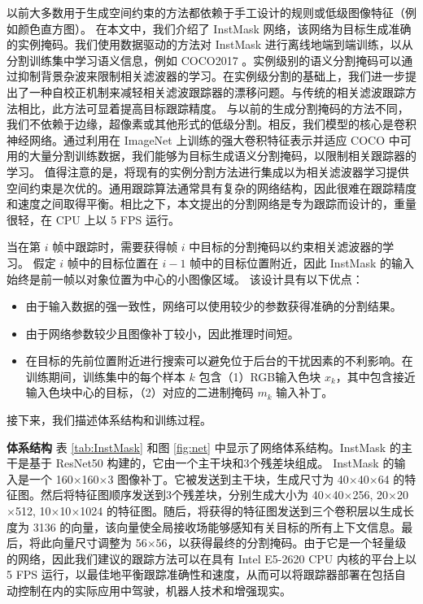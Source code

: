 以前大多数用于生成空间约束的方法都依赖于手工设计的规则或低级图像特征（例如颜色直方图）。
在本文中，我们介绍了 InstMask 网络，该网络为目标生成准确的实例掩码。我们使用数据驱动的方法对 InstMask 进行离线地端到端训练，以从分割训练集中学习语义信息，例如 COCO2017 \cite{COCO}。实例级别的语义分割掩码可以通过抑制背景杂波来限制相关滤波器的学习。在实例级分割的基础上，我们进一步提出了一种自校正机制来减轻相关滤波跟踪器的漂移问题。与传统的相关滤波跟踪方法相比，此方法可显着提高目标跟踪精度。
与以前的生成分割掩码的方法不同，我们不依赖于边缘，超像素或其他形式的低级分割。相反，我们模型的核心是卷积神经网络。通过利用在 ImageNet \cite{ImageNet} 上训练的强大卷积特征表示并适应 COCO 中可用的大量分割训练数据，我们能够为目标生成语义分割掩码，以限制相关跟踪器的学习。
值得注意的是，将现有的实例分割方法进行集成以为相关滤波器学习提供空间约束是次优的。通用跟踪算法通常具有复杂的网络结构，因此很难在跟踪精度和速度之间取得平衡。相比之下，本文提出的分割网络是专为跟踪而设计的，重量很轻，在 CPU 上以 5 FPS 运行。

当在第 $i$ 帧中跟踪时，需要获得帧 $i$ 中目标的分割掩码以约束相关滤波器的学习。
假定 $i$ 帧中的目标位置在 $i-1$ 帧中的目标位置附近，因此 InstMask 的输入始终是前一帧以对象位置为中心的小图像区域。
该设计具有以下优点：

\begin{itemize}
\item 由于输入数据的强一致性，网络可以使用较少的参数获得准确的分割结果。
\item 由于网络参数较少且图像补丁较小，因此推理时间短。
\item 在目标的先前位置附近进行搜索可以避免位于后台的干扰因素的不利影响。在训练期间，训练集中的每个样本 $k$ 包含（1）RGB输入色块 $x_k$，其中包含接近输入色块中心的目标，（2）对应的二进制掩码 $m_{k}$ 输入补丁。
\end{itemize}

接下来，我们描述体系结构和训练过程。

\textbf{体系结构} 表 \ref{tab:InstMask} 和图 \ref{fig:net} 中显示了网络体系结构。InstMask 的主干是基于 ResNet50 \cite{He2016DeepRL} 构建的，它由一个主干块和3个残差块组成。
InstMask 的输入是一个 160$\times$160$\times$3 图像补丁。它被发送到主干块，生成尺寸为 40$\times$40$\times$64 的特征图。然后将特征图顺序发送到3个残差块，分别生成大小为 40$\times$40$\times$256, 20$\times$20$\times$512, 10$\times$10$\times$1024 的特征图。随后，将获得的特征图发送到三个卷积层以生成长度为 3136 的向量，该向量使全局接收场能够感知有关目标的所有上下文信息。最后，将此向量尺寸调整为 56$\times$56，以获得最终的分割掩码。由于它是一个轻量级的网络，因此我们建议的跟踪方法可以在具有 Intel E5-2620 CPU 内核的平台上以 5 FPS 运行，以最佳地平衡跟踪准确性和速度，从而可以将跟踪器部署在包括自动控制在内的实际应用中驾驶，机器人技术和增强现实。

